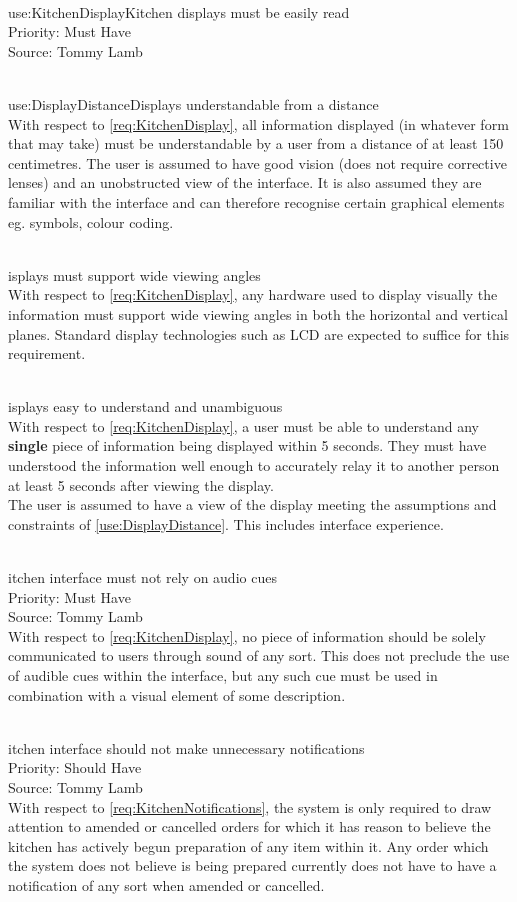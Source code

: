 \documentclass[11pt, a4paper]{report}
\def\itempar#1\\{\item \textbf{#1}\\} %
\begin{document}
\begin{enumerate}[label=NF-UR-\arabic*, series=nonfunctional]
\itempar \label{use:KitchenDisplay}Kitchen displays must be easily read\\
Priority: Must Have\\
Source: Tommy Lamb\\

\begin{enumerate}[label*=.\arabic*]
\itempar \label{use:DisplayDistance}Displays understandable from a distance\\
With respect to \autoref{req:KitchenDisplay}, all information displayed (in whatever form that may take) must be understandable by a user from a distance of at least 150 centimetres. The user is assumed to have good vision (does not require corrective lenses) and an unobstructed view of the interface. It is also assumed they are familiar with the interface and can therefore recognise certain graphical elements eg. symbols, colour coding.

\itempar Displays must support wide viewing angles\\
With respect to \autoref{req:KitchenDisplay}, any hardware used to display visually the information must support wide viewing angles in both the horizontal and vertical planes. Standard display technologies such as LCD are expected to suffice for this requirement.

\itempar Displays easy to understand and unambiguous\\
With respect to \autoref{req:KitchenDisplay}, a user must be able to understand any \textbf{single} piece of information being displayed within 5 seconds. They must have understood the information well enough to accurately relay it to another person at least 5 seconds after viewing the display.\\
The user is assumed to have a view of the display meeting the assumptions and constraints of \autoref{use:DisplayDistance}. This includes interface experience.
\end{enumerate}

\itempar Kitchen interface must not rely on audio cues\\
Priority: Must Have\\
Source: Tommy Lamb\\
With respect to \autoref{req:KitchenDisplay}, no piece of information should be solely communicated to users through sound of any sort. This does not preclude the use of audible cues within the interface, but any such cue must be used in combination with a visual element of some description.

\itempar Kitchen interface should not make unnecessary notifications\\
Priority: Should Have\\
Source: Tommy Lamb\\
With respect to \autoref{req:KitchenNotifications}, the system is only required to draw attention to amended or cancelled orders for which it has reason to believe the kitchen has actively begun preparation of any item within it. Any order which the system does not believe is being prepared currently does not have to have a notification of any sort when amended or cancelled. 


\end{enumerate}
\end{document}
